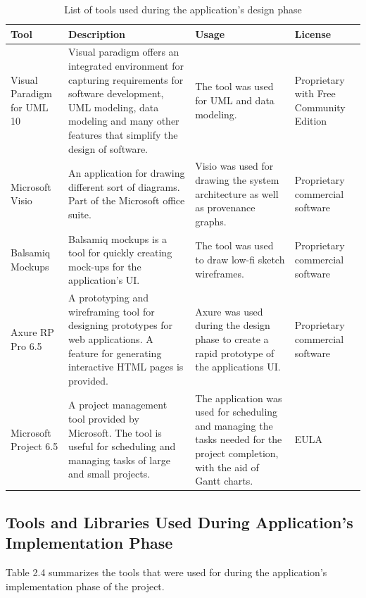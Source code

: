 \begin{table}
  \centering
  \begin{tabular}{|p{100px}|p{100px}|p{100px}|p{100px}|}
    \hline
    Tool  & Description & Usage & License \\
    \hline
    Visual Paradigm for UML 10 & Visual paradigm offers an integrated environment for capturing requirements for software development,  UML modeling, data modeling and many other features that simplify the design of software. & The tool was used for UML and data modeling. & Proprietary with Free Community Edition \\ \hline

    Microsoft Visio & An application for drawing different sort of diagrams. Part of the Microsoft office suite. & Visio was used for drawing the system architecture as well as provenance graphs. & Proprietary commercial software \\ \hline

    Balsamiq Mockups & Balsamiq mockups is a tool for quickly creating mock-ups for the application's UI. & The tool was used to draw low-fi sketch wireframes.  & Proprietary commercial software \\ \hline

    Axure RP Pro 6.5 & A prototyping and wireframing tool for designing prototypes for web applications. A feature for generating interactive HTML pages is provided.  & Axure was used during the design phase to create a rapid prototype of the applications UI. & Proprietary commercial software \\ \hline
    
    Microsoft Project 6.5 & A project management tool provided by Microsoft. The tool is useful for scheduling and managing tasks of large and small projects.  & The application was used for scheduling and managing the tasks needed for the project completion, with the aid of Gantt charts. & EULA \\ \hline

    \hline
  \end{tabular}
  \caption{List of tools used during the application's design phase}\label{designTools}
\end{table}

\subsection{Tools and Libraries Used During Application's Implementation Phase}

Table 2.4 summarizes the tools that were used for during the application's implementation phase of the project.

